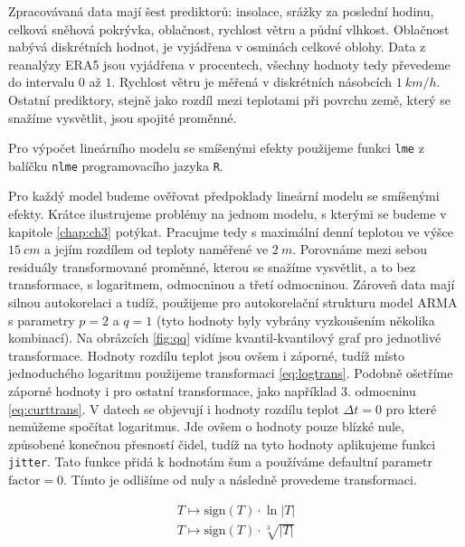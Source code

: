 Zpracovávaná data mají šest prediktorů: insolace, srážky za poslední hodinu, celková sněhová pokrývka, oblačnost, rychlost větru a půdní vlhkost. Oblačnost nabývá diskrétních hodnot, je vyjádřena v osminách celkové oblohy. Data z reanalýzy ERA5 jsou vyjádřena v procentech, všechny hodnoty tedy převedeme do intervalu $0$ až $1$. Rychlost větru je měřená v diskrétních násobcích $\SI{1}{km/h}$. Ostatní prediktory, stejně jako rozdíl mezi teplotami při povrchu země, který se snažíme vysvětlit, jsou spojité proměnné. 

Pro výpočet lineárního modelu se smíšenými efekty použijeme funkci \texttt{lme} z balíčku \texttt{nlme} programovacího jazyka \texttt{R}.

Pro každý model budeme ověřovat předpoklady lineární modelu se smíšenými efekty. Krátce ilustrujeme problémy na jednom modelu, s kterými se budeme v kapitole \ref{chap:ch3} potýkat. Pracujme tedy s maximální denní teplotou ve výšce $\SI{15}{cm}$ a jejím rozdílem od teploty naměřené ve $\SI{2}{m}$. Porovnáme mezi sebou residuály transformované proměnné, kterou se snažíme vysvětlit, a to bez transformace, s logaritmem, odmocninou a třetí odmocninou. Zároveň data mají silnou autokorelaci a tudíž, použijeme pro autokorelační strukturu model ARMA s parametry $p=2$ a $q=1$ (tyto hodnoty byly vybrány vyzkoušením několika kombinací). Na obrázcích \ref{fig:qq} vidíme kvantil-kvantilový graf pro jednotlivé transformace. Hodnoty rozdílu teplot jsou ovšem i záporné, tudíž místo jednoduchého logaritmu použijeme transformaci \eqref{eq:logtrans}. Podobně ošetříme záporné hodnoty i pro ostatní transformace, jako například 3. odmocninu \eqref{eq:curttrans}. V datech se objevují i hodnoty rozdílu teplot $\Delta t=0$ pro které nemůžeme spočítat logaritmus. Jde ovšem o hodnoty pouze blízké nule, způsobené konečnou přesností čidel, tudíž na tyto hodnoty aplikujeme funkci \texttt{jitter}. Tato funkce přidá k hodnotám šum a používáme defaultní parametr $\text{factor}=0$. Tímto je odlišíme od nuly a následně provedeme transformaci.

\begin{gather}
	T \mapsto \mathrm{sign}(T)\cdot \ln\left|T\right| \label{eq:logtrans}\\
	T \mapsto \mathrm{sign}(T)\cdot \sqrt[3]{\left|T\right|} \label{eq:curttrans}
\end{gather}

